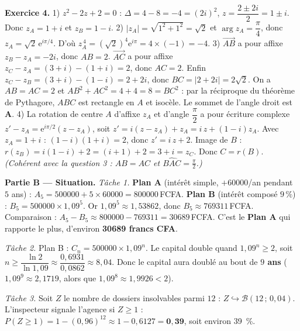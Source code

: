 \smallskip
\noindent\textbf{Exercice 4.}
1) $z^2-2z+2=0$ : $\Delta=4-8=-4=(2i)^2$, $z=\dfrac{2\pm2i}{2}=1\pm i$. Donc
$z_A=1+i$ et $z_B=1-i$.
2) $|z_A|=\sqrt{1^2+1^2}=\sqrt2$ et $\arg z_A=\dfrac{\pi}{4}$, donc
$z_A=\sqrt2\,\mathrm{e}^{i\pi/4}$. D'où
$z_A^{\,4}=(\sqrt2)^4\mathrm{e}^{i\pi}=4\times(-1)=-4$.
3) $\vec{AB}$ a pour affixe $z_B-z_A=-2i$, donc $AB=2$. $\vec{AC}$ a pour affixe
$z_C-z_A=(3+i)-(1+i)=2$, donc $AC=2$. Enfin $z_C-z_B=(3+i)-(1-i)=2+2i$, donc
$BC=|2+2i|=2\sqrt2$. On a $AB=AC=2$ et $AB^2+AC^2=4+4=8=BC^2$ : par la réciproque du
théorème de Pythagore, $ABC$ est rectangle en $A$ et isocèle. Le sommet de l'angle droit
est $\mathbf{A}$.
4) La rotation de centre $A$ d'affixe $z_A$ et d'angle $\dfrac\pi2$ a pour écriture
complexe $z'-z_A=\mathrm{e}^{i\pi/2}(z-z_A)$, soit $z'=i(z-z_A)+z_A=i\,z+(1-i)z_A$. Avec
$z_A=1+i$ : $(1-i)(1+i)=2$, donc $z'=i\,z+2$. Image de $B$ :
$r(z_B)=i(1-i)+2=(i+1)+2=3+i=z_C$. Donc $C=r(B)$. \emph{(Cohérent avec la question 3 :
$AB=AC$ et $\widehat{BAC}=\frac\pi2$.)}

\smallskip
\noindent\textbf{Partie B — Situation.}
\emph{Tâche 1.} \textbf{Plan A} (intérêt simple, $+\num{60000}$/an pendant $5$ ans) :
$A_5=\num{500000}+5\times\num{60000}=\num{800000}$\,FCFA. \textbf{Plan B} (intérêt composé
$9\,\%$) : $B_5=\num{500000}\times1{,}09^5$. Or $1{,}09^5\approx1{,}53862$, donc
$B_5\approx\num{769311}$\,FCFA. Comparaison : $A_5-B_5\approx\num{800000}-\num{769311}
=\num{30689}$\,FCFA. C'est le \textbf{Plan A} qui rapporte le plus, d'environ
\textbf{\num{30689} francs CFA}.

\emph{Tâche 2.} Plan B : $C_n=\num{500000}\times1{,}09^n$. Le capital double quand
$1{,}09^n\ge2$, soit $n\ge\dfrac{\ln2}{\ln1{,}09}\approx\dfrac{0{,}6931}{0{,}0862}\approx8{,}04$.
Donc le capital aura doublé au bout de \textbf{$9$ ans} ($1{,}09^9\approx2{,}1719$, alors
que $1{,}09^8\approx1{,}9926<2$).

\emph{Tâche 3.} Soit $Z$ le nombre de dossiers insolvables parmi $12$ :
$Z\hookrightarrow\mathcal{B}(12\,;\,0{,}04)$. L'inspecteur signale l'agence si $Z\ge1$ :
$P(Z\ge1)=1-(0{,}96)^{12}\approx1-0{,}6127=\mathbf{0{,}39}$, soit environ \SI{39}{\percent}.
